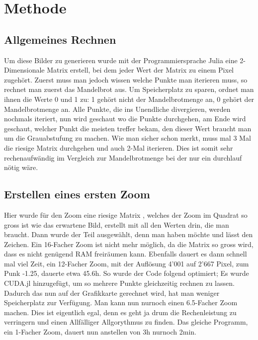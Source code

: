 \section{Methode}
\subsection{Allgemeines Rechnen}
Um diese Bilder zu generieren wurde mit der Programmiersprache Julia eine 2-Dimensionale Matrix erstell, bei dem jeder Wert der Matrix zu einem Pixel zugehört. Zuerst muss man jedoch wissen welche Punkte man iterieren muss, so rechnet man zuerst das Mandelbrot aus. Um Speicherplatz zu sparen, ordnet man ihnen die Werte 0 und 1 zu: 1 gehört nicht der Mandelbrotmenge an, 0 gehört der Mandelbrotmenge an. Alle Punkte, die ins Unendliche divergieren, werden nochmals iteriert, nun wird geschaut wo die Punkte durchgehen, am Ende wird geschaut, welcher Punkt die meisten treffer bekam, den dieser Wert braucht man um die Grauabstufung zu machen. Wie man sicher schon merkt, muss mal 3 Mal die riesige Matrix durchgehen und auch 2-Mal iterieren. Dies ist somit sehr rechenaufwändig im Vergleich zur Mandelbrotmenge bei der nur ein durchlauf nötig wäre.
\subsection{Erstellen eines ersten Zoom}
Hier wurde für den Zoom eine riesige Matrix , welches der Zoom im Quadrat so gross ist wie das erwartene Bild, erstellt mit all den Werten drin, die man braucht. Dann wurde der Teil ausgewählt, denn man haben möchte und lässt den Zeichen. Ein 16-Facher Zoom ist nicht mehr möglich, da die Matrix so gross wird, dass es nicht genügend RAM freiräumen kann. Ebenfalls dauert es dann schnell mal viel Zeit, ein 12-Facher Zoom, mit der Auflösung 4'001 auf 2'667 Pixel, zum Punk -1.25, dauerte etwa 45.6h. So wurde der Code folgend optimiert; Es wurde CUDA.jl hinzugefügt, um so mehrere Punkte gleichzeitig rechnen zu lassen. Dadurch das nun auf der Grafikkarte gerechnet wird, hat man weniger Speicherplatz zur Verfügung. Man kann nun nurnoch einen 6.5-Facher Zoom machen. Dies ist eigentlich egal, denn es geht ja drum die Rechenleistung zu verringern und einen Allfälliger Allgorythmus zu finden. Das gleiche Programm, ein 1-Facher Zoom, dauert nun anstellen von 3h nurnoch 2min.
